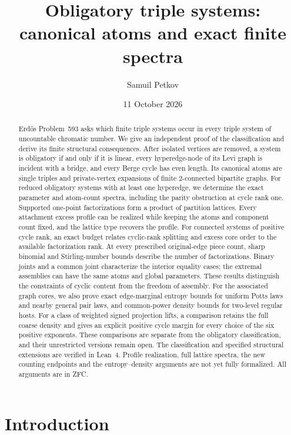 \documentclass[a4paper,11pt,reqno]{amsart}
\title[Obligatory triple systems]{Obligatory triple systems: canonical atoms and exact finite spectra}
\author{Samuil Petkov}
\date{11 October 2026}
\theoremstyle{plain}
\theoremstyle{definition}
\theoremstyle{remark}
\begin{document}
\begin{abstract}
Erdős Problem~593 asks which finite triple systems occur in every triple
system of uncountable chromatic number.  We give an independent proof of the
classification and derive its finite structural consequences.  After
isolated vertices are removed, a system is obligatory if and only if it is
linear, every hyperedge-node of its Levi graph is incident with a bridge,
and every Berge cycle has even length.  Its canonical atoms are single
triples and private-vertex expansions of finite $2$-connected bipartite
graphs.  For reduced obligatory systems with at least one hyperedge, we
determine the exact parameter and atom-count spectra, including the parity
obstruction at cycle rank one.  Supported one-point factorizations form a
product of partition lattices.  Every attachment excess profile can be
realized while keeping the atoms and component count fixed, and the lattice
type recovers the profile.  For connected systems of positive cycle rank, an
exact budget relates cyclic-rank splitting and excess core order to the
available factorization rank.  At every prescribed original-edge piece
count, sharp binomial and Stirling-number bounds describe the number of
factorizations.  Binary joints and a common joint characterize the interior
equality cases; the extremal assemblies can have the same atoms and global
parameters.  These results distinguish the constraints of cyclic content
from the freedom of assembly.  For the associated graph cores, we also prove
exact edge-marginal entropy bounds for uniform Potts laws and nearby general
pair laws, and common-power density bounds for two-level regular hosts.
For a class of weighted signed projection lifts, a comparison retains the
full coarse density and gives an explicit positive cycle margin
for every choice of the six positive exponents.  These comparisons are separate
from the obligatory classification, and their unrestricted versions remain open.
The classification and specified structural extensions are verified in Lean~4.
Profile realization, full lattice spectra, the new counting endpoints and
the entropy--density arguments are not yet fully formalized.
All arguments are in ZFC.
\end{abstract}

\maketitle

\section*{Introduction}\label{introduction}
\end{document}
